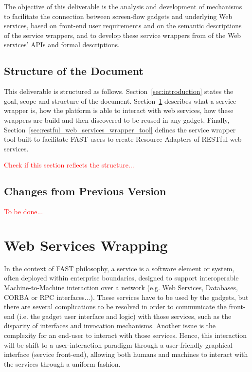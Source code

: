 \documentclass{fast_latex}
\begin{document}
The objective of this deliverable is the analysis and development of mechanisms to facilitate the connection between screen-flow gadgets and underlying Web services, based on front-end user requirements and on the semantic descriptions of the service wrappers, and to develop these service wrappers from of the Web services' APIs and formal descriptions.


\subsection{Structure of the Document} %
\label{sub:structure_of_the_document}

This deliverable is structured as follows. Section~\ref{sec:introduction} states the goal, scope and structure of the document. Section~\ref{sec:web_services_wrapping} describes what a service wrapper is, how the platform is able to interact with web services, how these wrappers are build and then discovered to be reused in any gadget. Finally, Section~\ref{sec:restful_web_services_wrapper_tool} defines the service wrapper tool built to facilitate FAST users to create Resource Adapters of RESTful web services.

\textcolor{red}{Check if this section reflects the structure...}


\subsection{Changes from Previous Version} %
\label{sub:changes_from_previous_version}

\textcolor{red}{To be done...}




\clearpage
\section{Web Services Wrapping} %
\label{sec:web_services_wrapping}

In the context of FAST philosophy, a service is a software element or system, often deployed within enterprise boundaries, designed to support interoperable Machine-to-Machine interaction over a network (e.g. Web Services, Databases, CORBA or RPC interfaces...). These services have to be used by the gadgets, but there are several complications to be resolved in order to communicate the front-end (i.e. the gadget user interface and logic) with those services, such as the disparity of interfaces and invocation mechanisms. Another issue is the complexity for an end-user to interact with those services. Hence, this interaction will be shift to a user-interaction paradigm through a user-friendly graphical interface (service front-end), allowing both humans and machines to interact with the services through a uniform fashion.
\end{document}
